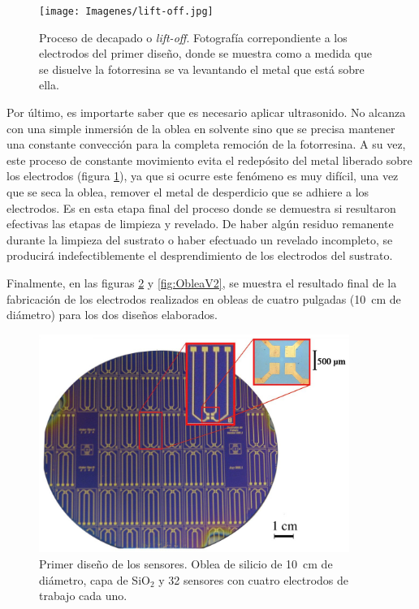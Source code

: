{					  %
					  \begin{figure}[ht!]
					  \begin{center}
					  \texttt{[image: Imagenes/lift-off.jpg]}
					  \caption[Proceso de decapado o\textit{ lift-off}]{Proceso de decapado o\textit{ lift-off}. Fotografía correpondiente a los electrodos del primer diseño, donde se muestra como a medida que se disuelve la fotorresina se va levantando el metal que está sobre ella.}
					  \label{fig:ultrasonido}
					  \end{center}
					  \end{figure}

		 Por último, es importarte saber que es necesario aplicar ultrasonido. No alcanza con una simple inmersión de la oblea en solvente sino que se precisa mantener una constante convección para la completa remoción de la fotorresina. A su vez, este proceso de constante movimiento evita el redepósito del metal liberado sobre los electrodos (figura \ref{fig:ultrasonido}), ya que si ocurre este fenómeno es muy difícil, una vez que se seca la oblea, remover el metal de desperdicio que se adhiere a los electrodos. Es en esta etapa final del proceso donde se demuestra si resultaron efectivas las etapas de limpieza y revelado. De haber algún residuo remanente durante la limpieza del sustrato o haber efectuado un revelado incompleto, se producirá indefectiblemente el desprendimiento de los electrodos del sustrato.

		 Finalmente, en las figuras \ref{fig:ObleaV1} y \ref{fig:ObleaV2}, se muestra el resultado final de la fabricación de los electrodos realizados en obleas de cuatro pulgadas (\SI{10}{\cm} de diámetro) para los dos diseños elaborados.

		 			  \clearpage
					  \begin{figure}[ht!]
					  \begin{center}
					  \includegraphics[width=0.90\textwidth]{Imagenes/ObleaV1.jpg}
					  \caption[Electrodos, primera versión]{Primer diseño de los sensores. Oblea de silicio de \SI{10}{cm} de diámetro, capa de SiO$_2$ y 32 sensores con cuatro electrodos de trabajo cada uno.}
					  \label{fig:ObleaV1}
					  \end{center}
					  \end{figure} 	

}
